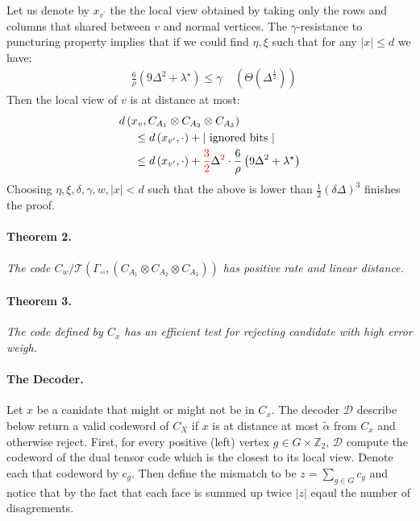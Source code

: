 \documentclass{article}
\begin{document}
\begin{multicols*}{2}
 Let us denote by $x_{v^{\prime}}$ the the local view obtained by taking only the rows and columns that shared between $v$ and normal vertices. The $\gamma$-resistance to puncturing property implies that if we could find $ \eta, \xi  $ such that for any $ |x| \le d $ we have:
 \begin{equation*}
   \begin{split}
     &  \frac{6}{\rho} \left( 9\Delta^{2} + \lambda^{\star}  \right) \le \gamma \ \ \ \ \ \left( \Theta\left(  \Delta^{\frac{1}{2}} \right) \right)
   \end{split}
 \end{equation*}
 Then the local view of $v$ is at distance at most:
 \begin{equation*}
   \begin{split}
     & d\left(x_{v}, C_{A_{1}} \otimes C_{A_{2}} \otimes C_{A_{3}}\right) \\ 
     & \ \ \ \ \le d\left(x_{v^{\prime} }, \cdot \right) + |\text{ ignored bits }|\\
     & \ \ \ \ \le  d\left(x_{v^{\prime}}, \cdot \right) +  \color{red}\frac{3}{2} \color{black} \Delta^{\color{red} 2 \color{black} } \cdot \frac{6}{\rho} \left( 9\Delta^{2} + \lambda^{\star}  \right) 
   \end{split}
 \end{equation*}
 Choosing $ \eta, \xi, \delta, \gamma, w, |x| < d $ such that the above is lower than $\frac{1}{2}\left( \delta\Delta \right)^{3}$ finishes the proof. 
 \paragraph{Theorem 2.} \textit{ The code $C_{w} / \mathcal{T}\left( \Gamma_{\square \square}, \left(  C_{A_1} \otimes C_{A_2} \otimes C_{A_3} \right)  \right)  $ has positive rate and linear distance.}
 \paragraph{Theorem 3.} \textit{ The code defined by $C_{x}$ has an efficient test for rejecting candidate with high error weigh. } 
 \paragraph{The Decoder.} Let $x$ be a canidate that might or might not be in $C_{x}$. The decoder $\mathcal{D}$ describe below return a valid codeword of $C_{X}$ if $x$ is at distance at most $\tilde{\alpha}$ from $C_{x}$ and otherwise reject.
 First, for every positive (left) vertex $g\in G\times \mathbb{Z}_2 $,  $\mathcal{D}$ compute the codeword of the dual tensor code which is the closest to its local view. Denote each that codeword by $c_g$. 
 Then define the mismatch to be $z = \sum_{g \in G}{c_g} $ and notice that by the fact that each face is summed up twice $|z|$ eqaul the number of disagrements. 
 

\end{multicols*}
\end{document}
